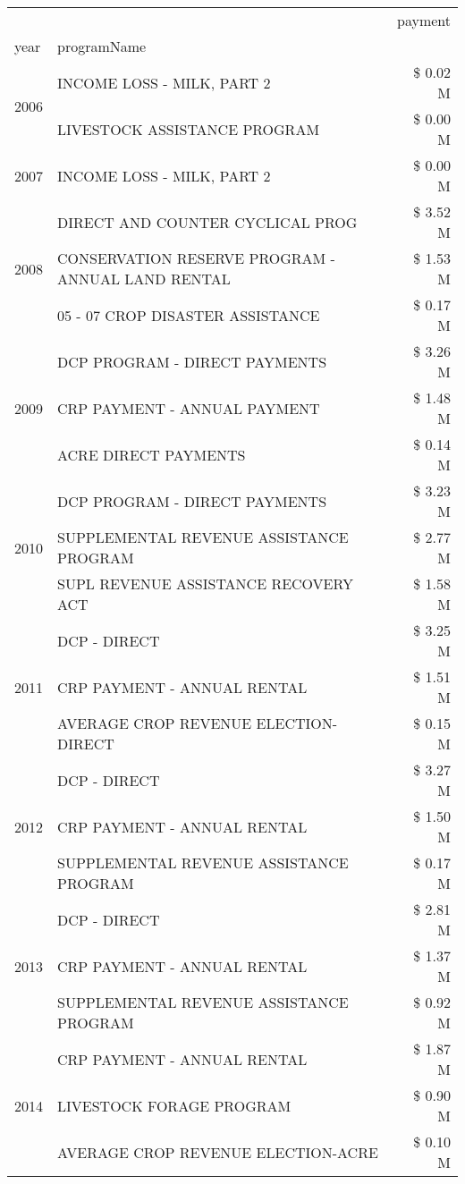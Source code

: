 \begin{tabular}{llr}
\toprule
 &  & payment \\
year & programName &  \\
\midrule
\multirow[t]{2}{*}{2006} & INCOME LOSS - MILK, PART 2 & \$ 0.02 M \\
 & LIVESTOCK ASSISTANCE PROGRAM & \$ 0.00 M \\
\cline{1-3}
2007 & INCOME LOSS - MILK, PART 2 & \$ 0.00 M \\
\cline{1-3}
\multirow[t]{3}{*}{2008} & DIRECT AND COUNTER CYCLICAL PROG & \$ 3.52 M \\
 & CONSERVATION RESERVE PROGRAM - ANNUAL LAND RENTAL & \$ 1.53 M \\
 & 05 - 07 CROP DISASTER ASSISTANCE & \$ 0.17 M \\
\cline{1-3}
\multirow[t]{3}{*}{2009} & DCP PROGRAM - DIRECT PAYMENTS & \$ 3.26 M \\
 & CRP PAYMENT - ANNUAL PAYMENT & \$ 1.48 M \\
 & ACRE DIRECT PAYMENTS & \$ 0.14 M \\
\cline{1-3}
\multirow[t]{3}{*}{2010} & DCP PROGRAM - DIRECT PAYMENTS & \$ 3.23 M \\
 & SUPPLEMENTAL REVENUE ASSISTANCE PROGRAM & \$ 2.77 M \\
 & SUPL REVENUE ASSISTANCE RECOVERY ACT & \$ 1.58 M \\
\cline{1-3}
\multirow[t]{3}{*}{2011} & DCP - DIRECT & \$ 3.25 M \\
 & CRP PAYMENT - ANNUAL RENTAL & \$ 1.51 M \\
 & AVERAGE CROP REVENUE ELECTION-DIRECT & \$ 0.15 M \\
\cline{1-3}
\multirow[t]{3}{*}{2012} & DCP - DIRECT & \$ 3.27 M \\
 & CRP PAYMENT - ANNUAL RENTAL & \$ 1.50 M \\
 & SUPPLEMENTAL REVENUE ASSISTANCE PROGRAM & \$ 0.17 M \\
\cline{1-3}
\multirow[t]{3}{*}{2013} & DCP - DIRECT & \$ 2.81 M \\
 & CRP PAYMENT - ANNUAL RENTAL & \$ 1.37 M \\
 & SUPPLEMENTAL REVENUE ASSISTANCE PROGRAM & \$ 0.92 M \\
\cline{1-3}
\multirow[t]{3}{*}{2014} & CRP PAYMENT - ANNUAL RENTAL & \$ 1.87 M \\
 & LIVESTOCK FORAGE PROGRAM & \$ 0.90 M \\
 & AVERAGE CROP REVENUE ELECTION-ACRE & \$ 0.10 M \\
\cline{1-3}

\end{tabular}
